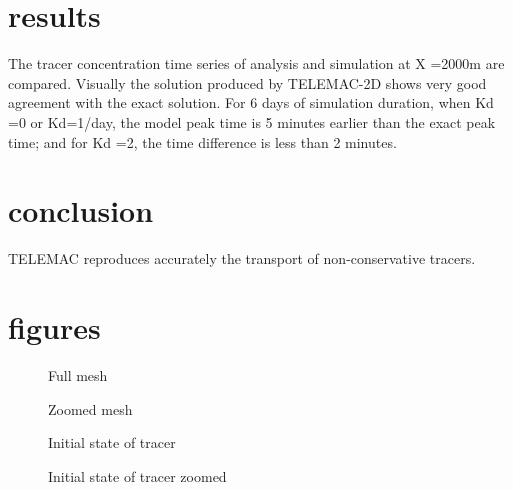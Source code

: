 \section{results}

The tracer concentration time series of analysis and simulation at X =2000m are
compared. Visually the solution produced by TELEMAC-2D shows very good
agreement with the exact solution. For 6 days of simulation duration, when Kd
=0 or Kd=1/day, the model peak time is 5 minutes earlier than the exact peak
time; and for Kd =2, the time difference is less than 2 minutes.

\section{conclusion}
TELEMAC reproduces accurately the transport of non-conservative tracers.

\section{figures}
\begin{figure}
\centering
\caption{Full mesh}\label{fig:tracer_decay:mesh}
\end{figure}

\begin{figure}
\centering
\caption{Zoomed mesh}\label{fig:tracer_decay:mesh_zoomed}
\end{figure}

\begin{figure}
\centering
\caption{Initial state of tracer}\label{fig:tracer_decay:tracer_t0}
\end{figure}

\begin{figure}
\centering
\caption{Initial state of tracer zoomed}\label{fig:tracer_decay:tracer_t0_zoomed}
\end{figure}

